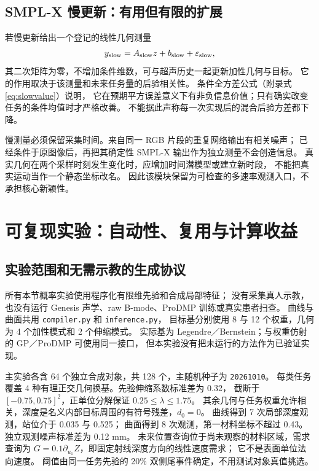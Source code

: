 \documentclass[11pt,a4paper]{article}
\numberwithin{equation}{section}
\theoremstyle{definition}
\begin{document}
\subsection{SMPL-X 慢更新：有用但有限的扩展}
若慢更新给出一个登记的线性几何测量
\begin{equation}
 y_{\rm slow}=A_{\rm slow}z+b_{\rm slow}+\varepsilon_{\rm slow},
 \label{eq:slow}
\end{equation}
其二次矩阵为零，不增加条件维数，可与超声历史一起更新加性几何与目标。
它的作用取决于该测量和未来任务量的后验相关性。
条件全方差公式（附录式\eqref{eq:slowvalue}）说明，
它在预期平方误差意义下有非负信息价值；只有确实改变任务的条件均值时才严格改善。
不能据此声称每一次实现后的混合后验方差都下降。

慢测量必须保留采集时间。来自同一 RGB 片段的重复网络输出有相关噪声；
已经条件于原图像后，再把其确定性 SMPL-X 输出作为独立测量不会创造信息。
真实几何在两个采样时刻发生变化时，应增加时间潜模型或建立新时段，
不能把真实运动当作一个静态坐标改名。
因此该模块保留为可检查的多速率观测入口，不承担核心新颖性。

\section{可复现实验：自动性、复用与计算收益}
\label{sec:experiments}

\subsection{实验范围和无需示教的生成协议}
所有本节概率实验使用程序化有限维先验和合成局部特征；
没有采集真人示教，也没有运行 Genesis 声学、raw B-mode、ProDMP 训练或真实患者扫查。
曲线与曲面共用 \texttt{compiler.py} 和 \texttt{inference.py}，
目标基分别使用 8 与 12 个权重，几何为 4 个加性模式和 2 个伸缩模式。
实际基为 Legendre／Bernstein；与权重仿射的 GP／ProDMP 可使用同一接口，
但本实验没有把未运行的方法作为已验证实现。

主实验各含 64 个独立合成对象，共 128 个，主随机种子为 \texttt{20261010}。
每类任务覆盖 4 种有理正交几何换基。先验伸缩系数标准差为 0.32，
截断于 \([-0.75,0.75]^2\)，正单位分解保证 \(0.25\le\lambda\le1.75\)。
其余几何与任务权重允许相关，深度是名义内部目标周围的有符号残差，\(d_0=0\)。
曲线得到 7 次局部深度观测，站位介于 0.035 与 0.525；
曲面得到 8 次观测，第一材料坐标不超过 0.43。独立观测噪声标准差为 0.12 mm。
未来位置查询位于尚未观察的材料区域，需求查询为
\(G=0.1\partial_{u_1}Z\)，即固定射线深度方向的线性速度需求；
它不是表面单位法向速度。
阈值由同一任务先验的 20\% 双侧尾事件确定，不用测试对象真值挑选。
\end{document}
